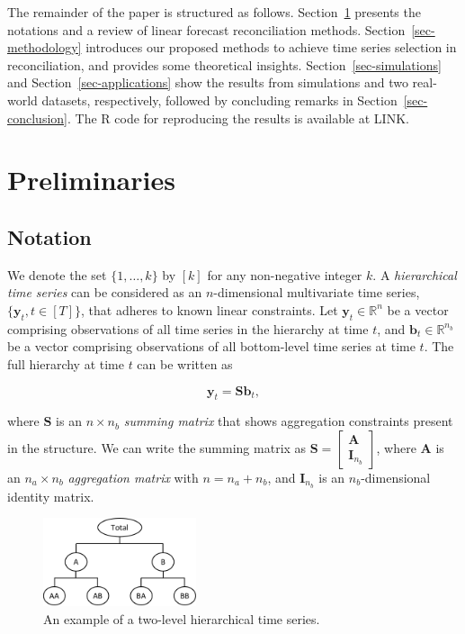 \documentclass[11pt,a4paper,]{article}
\begin{document}
The remainder of the paper is structured as follows.
Section~\ref{sec-preliminaries} presents the notations and a review of
linear forecast reconciliation methods. Section~\ref{sec-methodology}
introduces our proposed methods to achieve time series selection in
reconciliation, and provides some theoretical insights.
Section~\ref{sec-simulations} and Section~\ref{sec-applications} show
the results from simulations and two real-world datasets, respectively,
followed by concluding remarks in Section~\ref{sec-conclusion}. The R
code for reproducing the results is available at LINK.

\hypertarget{sec-preliminaries}{%
\section{Preliminaries}\label{sec-preliminaries}}

\hypertarget{notation}{%
\subsection{Notation}\label{notation}}

We denote the set \(\{1,\ldots,k\}\) by \([k]\) for any non-negative
integer \(k\). A \emph{hierarchical time series} can be considered as an
\(n\)-dimensional multivariate time series,
\(\{\boldsymbol{y}_t, t \in [T]\}\), that adheres to known linear
constraints. Let \(\boldsymbol{y}_t \in \mathbb{R}^n\) be a vector
comprising observations of all time series in the hierarchy at time
\(t\), and \(\boldsymbol{b}_t \in \mathbb{R}^{n_b}\) be a vector
comprising observations of all bottom-level time series at time \(t\).
The full hierarchy at time \(t\) can be written as

\[
\boldsymbol{y}_t = \boldsymbol{S}\boldsymbol{b}_t,
\]

where \(\boldsymbol{S}\) is an \(n \times n_b\) \emph{summing matrix}
that shows aggregation constraints present in the structure. We can
write the summing matrix as
\(\boldsymbol{S} = \left[\begin{array}{c}\boldsymbol{A} \\ \boldsymbol{I}_{n_b}\end{array}\right]\),
where \(\boldsymbol{A}\) is an \(n_a \times n_b\) \emph{aggregation
matrix} with \(n = n_a + n_b\), and \(\boldsymbol{I}_{n_b}\) is an
\(n_b\)-dimensional identity matrix.

\begin{figure}

{\centering \includegraphics[width=0.4\textwidth,height=\textheight]{figs/hts_example.pdf}

}

\caption{\label{fig-hts}An example of a two-level hierarchical time
series.}

\end{figure}
\end{document}
